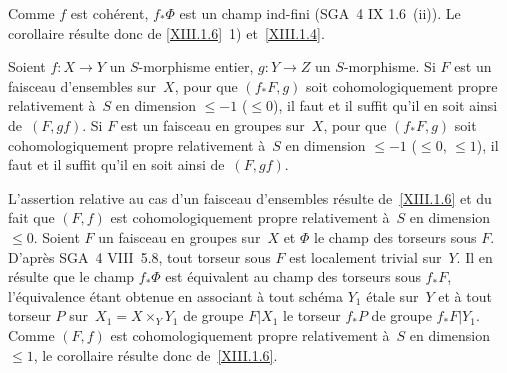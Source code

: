 Comme $f$ est coh\'erent, $f_* \Phi$ est un champ ind-fini (SGA~4 IX
1.6~(ii)). Le corollaire r\'esulte donc de \ref{XIII.1.6}~1)
et~\ref{XIII.1.4}.

\begin{corollaire}
\label{XIII.1.9}
Soient $f \colon X \to Y$ un $S$-morphisme entier, $g \colon Y \to Z$
un $S$-morphisme. Si $F$ est un faisceau d'ensembles sur~$X$, pour que
$(f_* F, g)$ soit cohomologiquement propre relativement \`a~$S$
en dimension $\leqslant -1$ (\resp $\leqslant 0$), il faut et il
suffit qu'il en soit ainsi de~$(F, gf)$. Si $F$ est un faisceau en
groupes sur~$X$, pour que $(f_* F, g)$ soit cohomologiquement
propre relativement \`a~$S$ en dimension $\leqslant -1$
(\resp $\leqslant 0$, \resp $\leqslant 1$), il faut et il suffit qu'il
en soit ainsi de~$(F, gf)$.
\end{corollaire}

L'assertion
relative au cas d'un faisceau d'ensembles r\'esulte
de~\ref{XIII.1.6} et du fait que $(F,f)$ est cohomologiquement propre
relativement \`a~$S$ en dimension $\leqslant 0$. Soient $F$ un
faisceau en groupes sur~$X$ et $\Phi$ le champ des torseurs sous $F$.
D'apr\`es SGA~4 VIII~5.8, tout torseur sous $F$ est localement
trivial sur~$Y$. Il en r\'esulte que le champ $f_* \Phi$ est
\'equivalent au champ des torseurs sous $f_* F$, l'\'equivalence
\'etant obtenue en associant \`a tout sch\'ema $Y_1$ \'etale
sur~$Y$ et \`a tout torseur $P$ sur~$X_1 = X \times_Y Y_1$ de groupe
$F|X_1$ le torseur $f_* P$ de groupe $f_* F | Y_1$. Comme $(F,f)$ est
cohomologiquement propre relativement \`a~$S$ en dimension
$\leqslant 1$, le corollaire r\'esulte donc de~\ref{XIII.1.6}.

